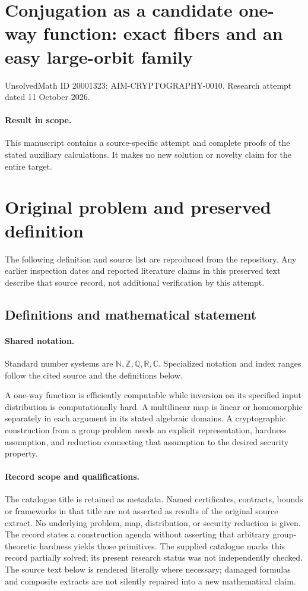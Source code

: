 \documentclass[11pt]{article}
\begin{document}
\section*{Conjugation as a candidate one-way function: exact fibers and an easy large-orbit family}
\noindent UnsolvedMath ID 20001323; AIM-CRYPTOGRAPHY-0010. Research attempt dated 11 October 2026.
\paragraph{Result in scope.}This manuscript contains a source-specific attempt and complete proofs of the stated auxiliary calculations. It makes no new solution or novelty claim for the entire target.
\section{Original problem and preserved definition}
The following definition and source list are reproduced from the repository. Any earlier inspection dates and reported literature claims in this preserved text describe that source record, not additional verification by this attempt.
\subsection{Definitions and mathematical statement}

\paragraph{Shared notation.}Standard number systems are $\mathbb N,\mathbb Z,\mathbb Q,\mathbb R,\mathbb C$. Specialized notation and index ranges follow the cited source and the definitions below.


A one-way function is efficiently computable while inversion on its specified input distribution is computationally hard. A multilinear map is linear or homomorphic separately in each argument in its stated algebraic domains. A cryptographic construction from a group problem needs an explicit representation, hardness assumption, and reduction connecting that assumption to the desired security property.
\paragraph{Record scope and qualifications.}
The catalogue title is retained as metadata. Named certificates, contracts, bounds or frameworks in that title are not asserted as results of the original source extract.
No underlying problem, map, distribution, or security reduction is given. The record states a construction agenda without asserting that arbitrary group-theoretic hardness yields those primitives. The supplied catalogue marks this record partially solved; its present research status was not independently checked.
The source text below is rendered literally where necessary; damaged formulas and composite extracts are not silently repaired into a new mathematical claim.
\end{document}
